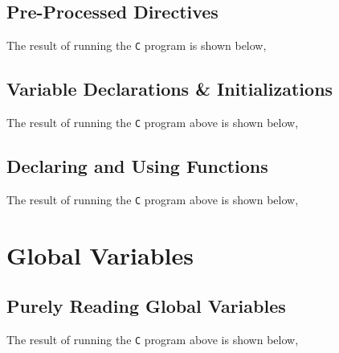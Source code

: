 \documentclass[a4paper, 12pt]{report}
\begin{document}
\begin{center}
\subsection{Pre-Processed Directives}
\begin{comment}
\end{comment}

The result of running the \texttt{C} program is shown below,


\subsection{Variable Declarations \& Initializations}
\begin{comment}
\end{comment}

The result of running the \texttt{C} program above is shown below,


\subsection{Declaring and Using Functions}
\begin{comment}
\end{comment}

The result of running the \texttt{C} program above is shown below,



\section{Global Variables}
\begin{comment}
\end{comment}

\subsection{Purely Reading Global Variables}
\begin{comment}
\end{comment}

The result of running the \texttt{C} program above is shown below,



\end{center}
\end{document}
